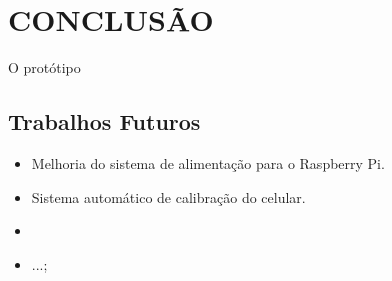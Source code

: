 
\chapter{CONCLUSÃO}
\label{chap:conclusao}

O protótipo 

\section{Trabalhos Futuros}
\label{sec:trabalhosFuturos}

\begin{itemize}
\item Melhoria do sistema de alimentação para o Raspberry Pi.
\item Sistema automático de calibração do celular.
\item 
\item ...;
\end{itemize}
